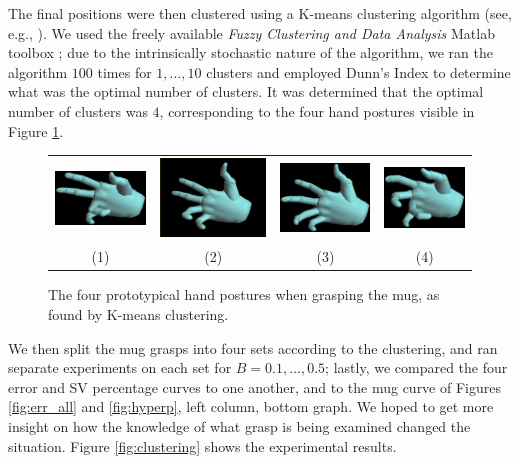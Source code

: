 The final positions were then clustered using a K-means clustering
algorithm (see, e.g., \cite{macqueen}). We used the freely available
\emph{Fuzzy Clustering and Data Analysis} Matlab toolbox
\cite{fctBalasko1,fctBalasko2}; due to the intrinsically stochastic
nature of the algorithm, we ran the algorithm $100$ times for
$1,\ldots,10$ clusters and employed Dunn's Index \cite{dunn} to
determine what was the optimal number of clusters. It was determined
that the optimal number of clusters was $4$, corresponding to the four
hand postures visible in Figure \ref{fig:postures}.

\begin{figure}[htbp]
  \begin{center}
    \begin{tabular}{cccc}
      \includegraphics[width=0.22\linewidth]{posture1.eps} &
      \includegraphics[width=0.22\linewidth]{posture2.eps} &
      \includegraphics[width=0.22\linewidth]{posture3.eps} &
      \includegraphics[width=0.22\linewidth]{posture4.eps} \\
      (1) & (2) & (3) & (4) \\
    \end{tabular}
    \caption{The four prototypical hand postures when grasping the
      mug, as found by K-means clustering.}
    \label{fig:postures}
  \end{center}
\end{figure}

We then split the mug grasps into four sets according to the
clustering, and ran separate experiments on each set for
$B=0.1,\ldots,0.5$; lastly, we compared the four error and SV
percentage curves to one another, and to the mug curve of Figures
\ref{fig:err_all} and \ref{fig:hyperp}, left column, bottom graph. We
hoped to get more insight on how the knowledge of what grasp is being
examined changed the situation. Figure \ref{fig:clustering} shows the
experimental results.


